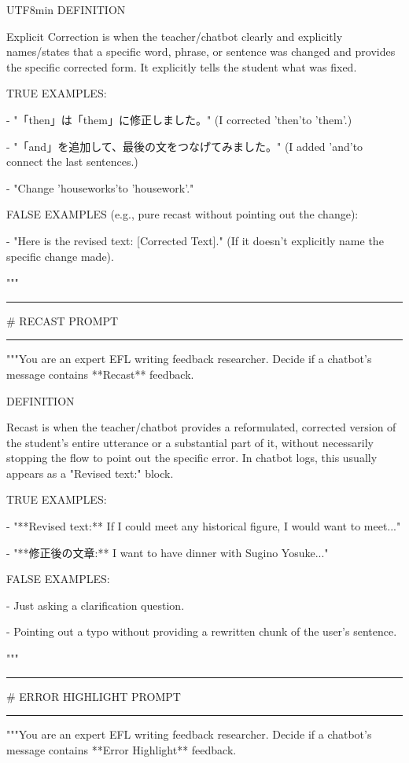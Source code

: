 \begin{CJK}{UTF8}{min}
DEFINITION

Explicit Correction is when the teacher/chatbot clearly and explicitly names/states that a specific word, phrase, or sentence was changed and provides the specific corrected form. It explicitly tells the student what was fixed.

TRUE EXAMPLES:

- "「then」は「them」に修正しました。" (I corrected 'then'to 'them'.)

- "「and」を追加して、最後の文をつなげてみました。" (I added 'and'to connect the last sentences.)

- "Change 'houseworks'to 'housework'."

FALSE EXAMPLES (e.g., pure recast without pointing out the change):

- "Here is the revised text: {[}Corrected Text{]}." (If it doesn't explicitly name the specific change made).

"""

\medskip\hrule\medskip

\# RECAST PROMPT

\medskip\hrule\medskip

"""You are an expert EFL writing feedback researcher. Decide if a chatbot's message contains **Recast** feedback.

DEFINITION

Recast is when the teacher/chatbot provides a reformulated, corrected version of the student's entire utterance or a substantial part of it, without necessarily stopping the flow to point out the specific error. In chatbot logs, this usually appears as a "Revised text:" block.

TRUE EXAMPLES:

- "**Revised text:** If I could meet any historical figure, I would want to meet..."

- "**修正後の文章:** I want to have dinner with Sugino Yosuke..."

FALSE EXAMPLES:

- Just asking a clarification question.

- Pointing out a typo without providing a rewritten chunk of the user's sentence.

"""

\medskip\hrule\medskip

\# ERROR HIGHLIGHT PROMPT

\medskip\hrule\medskip

"""You are an expert EFL writing feedback researcher. Decide if a chatbot's message contains **Error Highlight** feedback.


\end{CJK}

